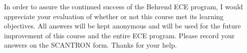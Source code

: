 

\small{
In order to assure the continued success of the Behrend ECE
program, I would appreciate your evaluation of whether or
not this course met its learning objectives.  All answers
will be kept anonymous and will be used for the future 
improvement of this course and the entire ECE program.
Please record your answers on the SCANTRON form.
Thanks for your help.
}

